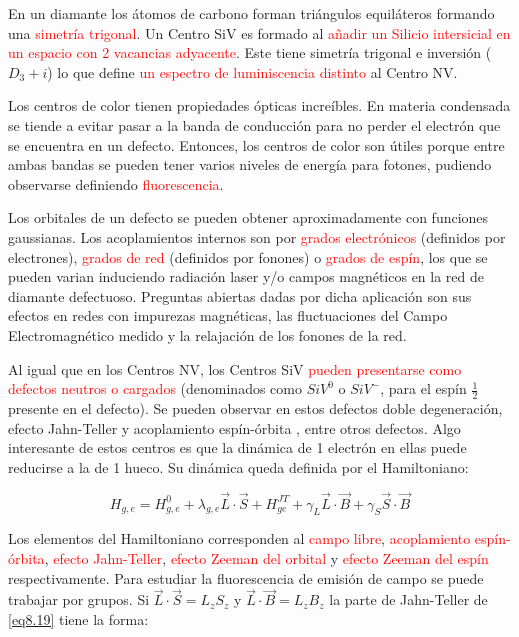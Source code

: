 \documentclass{book}
\begin{document}
En un diamante los átomos de carbono forman triángulos equiláteros formando una \textcolor{red}{simetría trigonal}. Un Centro SiV es formado al \textcolor{red}{añadir un Silicio intersicial en un espacio con 2 vacancias adyacente}. Este tiene simetría trigonal e inversión ($D_3+i$) lo que define \textcolor{red}{un espectro de luminiscencia distinto} al Centro NV.

Los centros de color tienen propiedades ópticas increíbles. En materia condensada se tiende a evitar pasar a la banda de conducción para no perder el electrón que se encuentra en un defecto. Entonces, los centros de color son útiles porque entre ambas bandas se pueden tener varios niveles de energía para fotones, pudiendo observarse definiendo \textcolor{red}{fluorescencia}.

Los orbitales de un defecto se pueden obtener aproximadamente con funciones gaussianas. Los acoplamientos internos son por \textcolor{red}{grados electrónicos} (definidos por electrones), \textcolor{red}{grados de red} (definidos por fonones) o \textcolor{red}{grados de espín}, los que se pueden varian induciendo radiación laser y/o campos magnéticos en la red de diamante defectuoso. Preguntas abiertas dadas por dicha aplicación son sus efectos en redes con impurezas magnéticas, las fluctuaciones del Campo Electromagnético medido y la relajación de los fonones de la red. 

Al igual que en los Centros NV, los Centros SiV \textcolor{red}{pueden presentarse como defectos neutros o cargados} (denominados como $SiV^0$ o $SiV^-$, para el espín $\frac{1}{2}$ presente en el defecto). Se pueden observar en estos defectos doble degeneración, efecto Jahn-Teller y acoplamiento espín-órbita , entre otros defectos. Algo interesante de estos centros es que la dinámica de 1 electrón en ellas puede reducirse a la de 1 hueco. Su dinámica queda definida por el Hamiltoniano:

\begin{equation}\label{eq8.18}H_{g,e}=H_{g,e}^0+\lambda_{g,e}\vec{L}\cdot\vec{S}+H_{ge}^{JT}+\gamma_L\vec{L}\cdot\vec{B}+\gamma_S\vec{S}\cdot\vec{B}\end{equation}

Los elementos del Hamiltoniano corresponden al \textcolor{red}{campo libre}, \textcolor{red}{acoplamiento espín-órbita}, \textcolor{red}{efecto Jahn-Teller}, \textcolor{red}{efecto Zeeman del orbital} y \textcolor{red}{efecto Zeeman del espín} respectivamente. Para estudiar la fluorescencia de emisión de campo se puede trabajar por grupos. Si $\vec{L}\cdot\vec{S}=L_zS_z$ y $\vec{L}\cdot\vec{B}=L_zB_z$ la parte de Jahn-Teller de \ref{eq8.19} tiene la forma:
\end{document}
